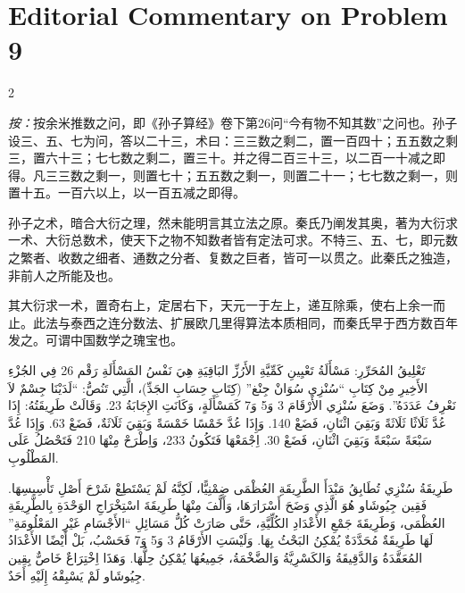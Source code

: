\documentclass[11pt,a4paper]{article}
\newcommand{\ar}[1]{\arabicfont\beginR #1\endR}
\newenvironment{bilingual}{%
  \begin{paracol}{2}
}{%
  \end{paracol}
}
\begin{document}
\newpage

\section*{Editorial Commentary on Problem 9}

\begin{bilingual}

\begin{leftcolumn*}
\textit{按：}按余米推数之问，即《孙子算经》卷下第26问``今有物不知其数''之问也。孙子设三、五、七为问，答以二十三，术曰：三三数之剩二，置一百四十；五五数之剩三，置六十三；七七数之剩二，置三十。并之得二百三十三，以二百一十减之即得。凡三三数之剩一，则置七十；五五数之剩一，则置二十一；七七数之剩一，则置十五。一百六以上，以一百五减之即得。

孙子之术，暗合大衍之理，然未能明言其立法之原。秦氏乃阐发其奥，著为大衍求一术、大衍总数术，使天下之物不知数者皆有定法可求。不特三、五、七，即元数之繁者、收数之细者、通数之分者、复数之巨者，皆可一以贯之。此秦氏之独造，非前人之所能及也。

其大衍求一术，置奇右上，定居右下，天元一于左上，递互除乘，使右上余一而止。此法与泰西之连分数法、扩展欧几里得算法本质相同，而秦氏早于西方数百年发之。可谓中国数学之瑰宝也。
\end{leftcolumn*}

\begin{rightcolumn*}
\ar{تَعْلِيقُ المُحَرِّرِ: مَسْأَلَةُ تَعْيِينِ كَمِّيَّةِ الأَرُزِّ البَاقِيَةِ هِيَ نَفْسُ المَسْأَلَةِ رَقْم 26 فِي الجُزْءِ الأَخِيرِ مِنْ كِتَابِ \enquote{سُنْزِي سُوَانْ جِنْغ} (كِتَابِ حِسَابِ الجَدِّ)، الَّتِي تَنُصُّ: \enquote{لَدَيْنَا جِسْمٌ لاَ نَعْرِفُ عَدَدَهُ}. وَضَعَ سُنْزِي الأَرْقَامَ 3 وَ5 وَ7 كَمَسْأَلَةٍ، وَكَانَتِ الإِجَابَةُ 23. وَقَالَتْ طَرِيقَتُهُ: إِذَا عُدَّ ثَلَاثًا ثَلَاثَةً وَبَقِيَ اثْنَانِ، فَضَعْ 140. وَإِذَا عُدَّ خَمْسًا خَمْسَةً وَبَقِيَ ثَلَاثَةٌ، فَضَعْ 63. وَإِذَا عُدَّ سَبْعَةً سَبْعَةً وَبَقِيَ اثْنَانِ، فَضَعْ 30. اِجْمَعْهَا فَتَكُونُ 233، وَاِطْرَحْ مِنْهَا 210 فَتَحْصُلُ عَلَى المَطْلُوبِ.}

\ar{طَرِيقَةُ سُنْزِي تُطَابِقُ مَبْدَأَ الطَّرِيقَةِ العُظْمَى ضِمْنِيًّا، لَكِنَّهُ لَمْ يَسْتَطِعْ شَرْحَ أَصْلِ تَأْسِيسِهَا. فَقِين جِيُوشَاو هُوَ الَّذِي وَضَحَ أَسْرَارَهَا، وَأَلَّفَ مِنْهَا طَرِيقَةَ اسْتِخْرَاجِ الوَحْدَةِ بِالطَّرِيقَةِ العُظْمَى، وَطَرِيقَةَ جَمْعِ الأَعْدَادِ الكُلِّيَّةِ، حَتَّى صَارَتْ كُلُّ مَسَائِلِ \enquote{الأَجْسَامِ غَيْرِ المَعْلُومَةِ} لَهَا طَرِيقَةٌ مُحَدَّدَةٌ يُمْكِنُ البَحْثُ بِهَا. وَلَيْسَتِ الأَرْقَامُ 3 وَ5 وَ7 فَحَسْبُ، بَلْ أَيْضًا الأَعْدَادُ المُعَقَّدَةُ وَالدَّقِيقَةُ وَالكَسْرِيَّةُ وَالضَّخْمَةُ، جَمِيعُهَا يُمْكِنُ حِلُّهَا. وَهَذَا اِخْتِرَاعٌ خَاصٌّ بِقِين جِيُوشَاو لَمْ يَسْبِقْهُ إِلَيْهِ أَحَدٌ.}


\end{rightcolumn*}
\end{bilingual}
\end{document}
